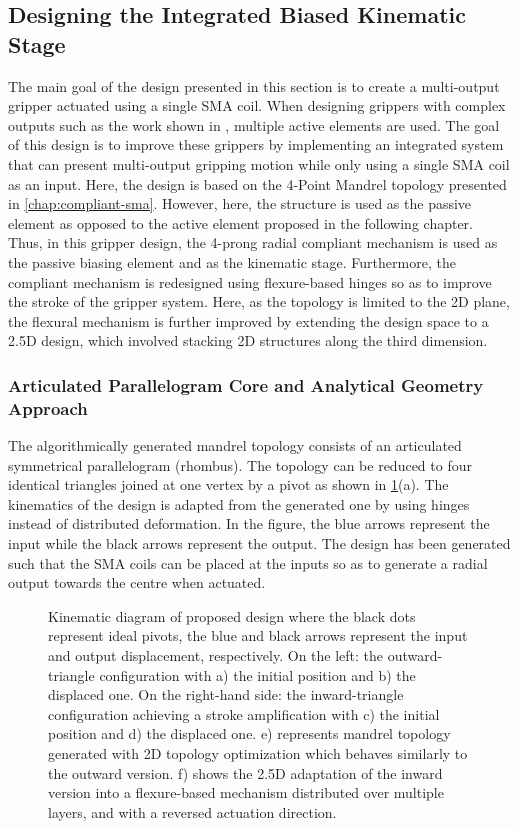 \subsection{Designing the Integrated Biased Kinematic Stage}
The main goal of the design presented in this section is to create a multi-output gripper actuated using a single SMA coil. When designing grippers with complex outputs such as the work shown in \cite{zhakypovOrigamiInspiredReconfigurableSuction2018}, multiple active elements are used. The goal of this design is to improve these grippers by implementing an integrated system that can present multi-output gripping motion while only using a single SMA coil as an input. Here, the design is based on the 4-Point Mandrel topology presented in \cref{chap:compliant-sma}. However, here, the structure is used as the passive element as opposed to the active element proposed in the following chapter. Thus, in this gripper design, the 4-prong radial compliant mechanism is used as the passive biasing element and as the kinematic stage. Furthermore, the compliant mechanism is redesigned using flexure-based hinges so as to improve the stroke of the gripper system. Here, as the topology is limited to the 2D plane, the flexural mechanism is further improved by extending the design space to a 2.5D design, which involved stacking 2D structures along the third dimension.
\subsubsection{Articulated Parallelogram Core and Analytical Geometry Approach}
The algorithmically generated mandrel topology consists of an articulated symmetrical parallelogram (rhombus). The topology can be reduced to four identical triangles joined at one vertex by a pivot as shown in \cref{fig:mandrel-kinematic}(a). The kinematics of the design is adapted from the generated one by using hinges instead of distributed deformation. In the figure, the blue arrows represent the input while the black arrows represent the output. The design has been generated such that the SMA coils can be placed at the inputs so as to generate a radial output towards the centre when actuated.

\begin{figure}[hbt!] %
  \centering
  \resizebox{\textwidth}{!}{}
  \caption{Kinematic diagram of proposed design where the black dots represent ideal pivots, the blue and black arrows represent the input and output displacement, respectively. On the left: the outward-triangle configuration with a) the initial position and b) the displaced one. On the right-hand side: the inward-triangle configuration achieving a stroke amplification with c) the initial position and d) the displaced one. e) represents mandrel topology generated with 2D topology optimization which behaves similarly to the outward version. f) shows the 2.5D adaptation of the inward version into a flexure-based mechanism distributed over multiple layers, and with a reversed actuation direction.}
  \label{fig:mandrel-kinematic}
\end{figure}

